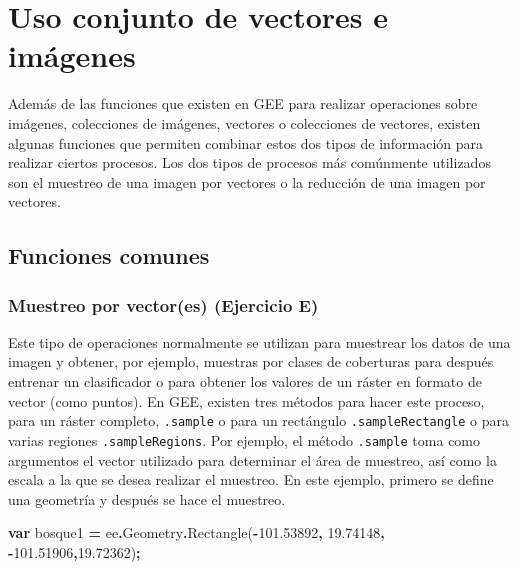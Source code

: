 \documentclass[
  12pt,
  letterpaper,
  twoside]{book}
\newenvironment{Shaded}{\begin{snugshade}}{\end{snugshade}}
\newcommand{\AttributeTok}[1]{\textcolor[rgb]{0.77,0.63,0.00}{#1}}
\newcommand{\FloatTok}[1]{\textcolor[rgb]{0.00,0.00,0.81}{#1}}
\newcommand{\FunctionTok}[1]{\textcolor[rgb]{0.00,0.00,0.00}{#1}}
\newcommand{\KeywordTok}[1]{\textcolor[rgb]{0.13,0.29,0.53}{\textbf{#1}}}
\newcommand{\NormalTok}[1]{#1}
\newcommand{\OperatorTok}[1]{\textcolor[rgb]{0.81,0.36,0.00}{\textbf{#1}}}
\begin{document}
\newpage

\hypertarget{uso-conjunto-de-vectores-e-imuxe1genes}{%
\chapter{Uso conjunto de vectores e imágenes}\label{uso-conjunto-de-vectores-e-imuxe1genes}}

Además de las funciones que existen en GEE para realizar operaciones sobre imágenes, colecciones de imágenes, vectores o colecciones de vectores, existen algunas funciones que permiten combinar estos dos tipos de información para realizar ciertos procesos. Los dos tipos de procesos más comúnmente utilizados son el muestreo de una imagen por vectores o la reducción de una imagen por vectores.

\hypertarget{funciones-comunes-5}{%
\section{Funciones comunes}\label{funciones-comunes-5}}

\hypertarget{muestreo-por-vectores-ejercicio-e}{%
\subsection{Muestreo por vector(es) (Ejercicio E)}\label{muestreo-por-vectores-ejercicio-e}}

Este tipo de operaciones normalmente se utilizan para muestrear los datos de una imagen y obtener, por ejemplo, muestras por clases de coberturas para después entrenar un clasificador o para obtener los valores de un ráster en formato de vector (como puntos). En GEE, existen tres métodos para hacer este proceso, para un ráster completo, \texttt{.sample} o para un rectángulo \texttt{.sampleRectangle} o para varias regiones \texttt{.sampleRegions}. Por ejemplo, el método \texttt{.sample} toma como argumentos el vector utilizado para determinar el área de muestreo, así como la escala a la que se desea realizar el muestreo. En este ejemplo, primero se define una geometría y después se hace el muestreo.

\begin{Shaded}
\begin{Highlighting}[]
\KeywordTok{var}\NormalTok{ bosque1 }\OperatorTok{=}\NormalTok{ ee}\OperatorTok{.}\AttributeTok{Geometry}\OperatorTok{.}\FunctionTok{Rectangle}\NormalTok{(}\OperatorTok{{-}}\FloatTok{101.53892}\OperatorTok{,} \FloatTok{19.74148}\OperatorTok{,} 
  \OperatorTok{{-}}\FloatTok{101.51906}\OperatorTok{,}\FloatTok{19.72362}\NormalTok{)}\OperatorTok{;}
\end{Highlighting}
\end{Shaded}
\end{document}
